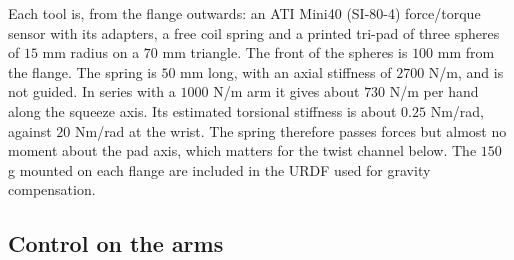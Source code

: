 Each tool is, from the flange outwards: an ATI Mini40 (SI-80-4) force/torque sensor with its adapters, a free coil spring and a printed tri-pad of three spheres of $15$ mm radius on a $70$ mm triangle. The front of the spheres is $100$ mm from the flange. The spring is $50$ mm long, with an axial stiffness of $2700$ N/m, and is not guided. In series with a $1000$ N/m arm it gives about $730$ N/m per hand along the squeeze axis. Its estimated torsional stiffness is about $0.25$ Nm/rad, against $20$ Nm/rad at the wrist. The spring therefore passes forces but almost no moment about the pad axis, which matters for the twist channel below. The $150$ g mounted on each flange are included in the URDF used for gravity compensation.

\begin{table}[htbp]\centering\small
\caption{The hardware configuration of the runs of 21--22 October 2026.}\label{tab:kinova-setup}
\end{table}

\subsection{Control on the arms}

